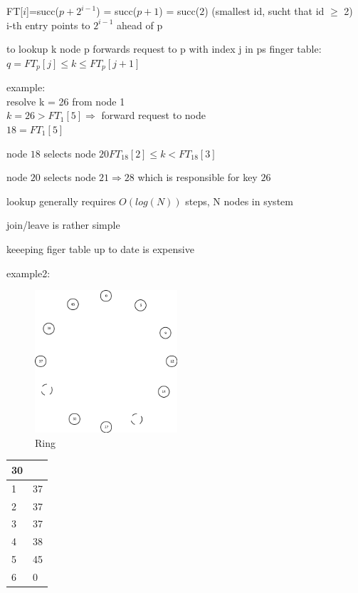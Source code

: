 \documentclass[ngerman,a4paper]{report}
\begin{document}
\begin{compactitem}
FT[$i$]=succ($p+2^{i-1}$) = succ($p+1$) = succ($2$) (smallest id, sucht that id $\geq$ 2)\\
i-th entry points to $2^{i-1}$ ahead of p
\item to lookup k node p forwards request to p with index j in ps finger table:\\
$q = FT_p[j] \leq k \leq FT_p[j+1]$
\item example:\\
resolve k = 26 from node 1 \\
$k=26 > FT_1[5] \Rightarrow$ forward request to node\\
$18 = FT_1[5]$
\begin{compactitem}
\item node $18$ selects node $20 FT_{18}[2] \leq k < FT_{18}[3]$\\
\item node $20$ selects node $21 \Rightarrow 28 $ which is responsible for key $26$\\
\item lookup generally requires $O(log(N))$ steps, N nodes in system
\item join/leave is rather simple
\item keeeping figer table up to date is expensive
\end{compactitem}
\item example2:\\
\begin{figure}[h]
	\centering
	\includegraphics[width=200px]{gfx/Chord_Fingertable.png}
	\caption{Ring}
	\label{img:ring}
\end{figure}
\begin{tabular}{|l|l|}
\hline
30 & \\
\hline
1 & 37\\
\hline
2 & 37\\
\hline
3 & 37\\
\hline
4 & 38\\
\hline
5 & 45\\
\hline
6 & 0\\
\hline
\end{tabular}

\end{compactitem}
\end{document}
